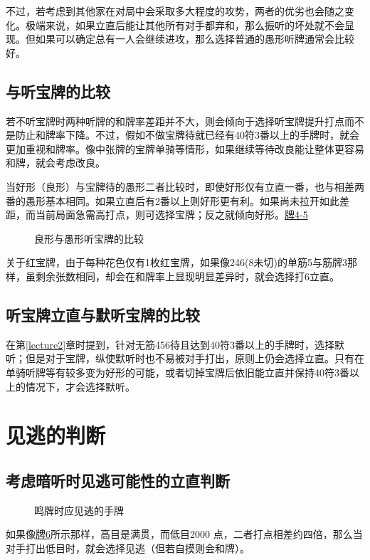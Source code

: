 不过，若考虑到其他家在对局中会采取多大程度的攻势，两者的优劣也会随之变化。极端来说，如果立直后能让其他所有对手都弃和，那么振听的坏处就不会显现。但如果可以确定总有一人会继续进攻，那么选择普通的愚形听牌通常会比较好。

\subsection{与听宝牌的比较}
若不听宝牌时两种听牌的和牌率差距并不大，则会倾向于选择听宝牌提升打点而不是防止和牌率下降。不过，假如不做宝牌待就已经有40符3番以上的手牌时，就会更加重视和牌率。像中张牌的宝牌单骑等情形，如果继续等待改良能让整体更容易和牌，就会考虑改良。

当好形（良形）与宝牌待的愚形二者比较时，即使好形仅有立直一番，也与相差两番的愚形基本相同。如果立直后有2番以上则好形更有利。如果尚未拉开如此差距，而当前局面急需高打点，则可选择宝牌；反之就倾向好形。\hyperref[lec4:pai4-5]{牌4-5}

\begin{figure}[h]
    \caption{良形与愚形听宝牌的比较}\label{lec4:pai4-5}
    \par\bigskip
\end{figure}

关于红宝牌，由于每种花色仅有1枚红宝牌，如果像246(8未切)的单筋5与筋牌3那样，虽剩余张数相同，却会在和牌率上显现明显差异时，就会选择打6立直。

\subsection{听宝牌立直与默听宝牌的比较}
在第\ref{lecture2}章时提到，针对无筋456待且达到40符3番以上的手牌时，选择默听；但是对于宝牌，纵使默听时也不易被对手打出，原则上仍会选择立直。只有在单骑听牌等有较多变为好形的可能，或者切掉宝牌后依旧能立直并保持40符3番以上的情况下，才会选择默听。

\section{见逃的判断}
\subsection{考虑暗听时见逃可能性的立直判断}
\begin{figure}[h]
    \caption{鸣牌时应见逃的手牌}\label{lec4:pai6}
\end{figure}
如果像\hyperref[lec4:pai6]{牌6}所示那样，高目是满贯，而低目2000 点，二者打点相差约四倍，那么当对手打出低目时，就会选择见逃（但若自摸则会和牌）。

